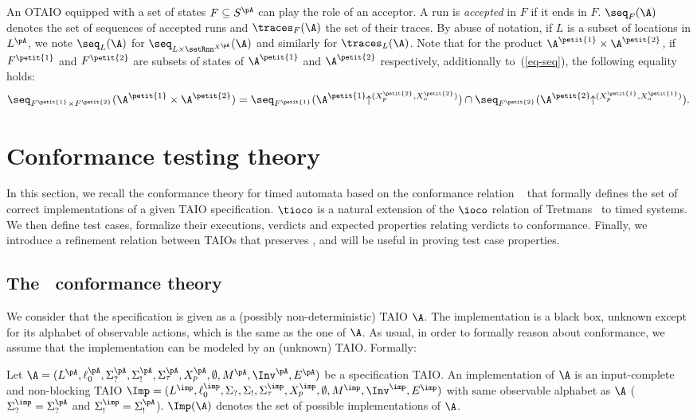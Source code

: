 \documentclass{LMCS}
\theoremstyle{plain}\newtheorem{proposition}[thm]{Proposition}
\begin{document}
An OTAIO  equipped 
with a set of states $F \subseteq S^\pA$ can play the role of an acceptor.
A run is  {\em accepted} in $F$ if it ends in $F$.
$\seq_{F}(\A)$ denotes the set of sequences of accepted runs
and $\traces_{F}(\A)$ the set of their traces.
By abuse of notation, if $L$ is a subset of locations in $L^\pA$,
we note $\seq_L(\A)$ for $\seq_{L\times\setRnn^{X^\pA}}(\A)$ and 
similarly for $\traces_L(\A)$. 
Note that for the product $\A^{\petit{1}} \times \A^{\petit{2}}$, if $F^{\petit{1}}$ and $F^{\petit{2}}$
are subsets of states of $\A^{\petit{1}}$ and $\A^{\petit{2}}$ respectively, additionally to~(\ref{eq-seq}), the following equality holds:
\begin{equation}
\label{eq-seq-acc} 
\seq_{F^{\petit{1}}\times F^{\petit{2}}}(\A^{\petit{1}} \times
  \A^{\petit{2}}) =
  \seq_{F^{\petit{1}}}(\A^{\petit{1}}\!\!\uparrow^{(X^{\petit{2}}_p,X^{\petit{2}}_o)})
  \cap
  \seq_{F^{\petit{2}}}(\A^{\petit{2}}\!\!\uparrow^{(X^{\petit{1}}_p,X^{\petit{1}}_o)}).
\end{equation}



\section{Conformance testing theory}
\label{sec-conformance}

In this section, we recall the conformance theory for timed automata
based on the conformance relation \tioco~\cite{KrichenTripakis09}
 that formally defines the set of correct
implementations of a given TAIO specification.  $\tioco$ is a natural
extension of the $\ioco$ relation of Tretmans~\cite{Tretmans-SCT96} to timed
systems.  We then define test cases, formalize their executions,
verdicts and expected properties relating verdicts to conformance. 
Finally, we introduce a refinement
relation between TAIOs that preserves \tioco, and will be useful in proving 
test case properties.

\subsection{The \tioco~conformance theory}
We consider that the specification is given as a  (possibly
non-deterministic) TAIO $\A$.
The implementation is a black box, unknown
except for its alphabet of observable actions, which is the same as
the one of $\A$.  
As usual, in order to formally
reason about conformance, we assume that the implementation can be
modeled by an (unknown) TAIO.
Formally:
\begin{defi}[Implementation]
Let $\A=(L^\pA,\ell_0^\pA,\Sigma_?^\pA,\Sigma_!^\pA,\Sigma_\tau^\pA,X_p^\pA,\emptyset,M^\pA,\Inv^\pA,E^\pA)$ be a specification TAIO.
An implementation of $\A$ is an input-complete and non-blocking TAIO
$\Imp=(L^\imp,\ell_0^\imp,\Sigma_?,\Sigma_!,\Sigma_\tau^\imp,X_p^\imp,\emptyset,M^\imp,\Inv^\imp,E^\imp)$
with same observable alphabet as $\A$ ($\Sigma_?^\imp=\Sigma_?^\pA$ and $\Sigma_!^\imp=\Sigma_!^\pA$).
$\Imp(\A)$ denotes the set of possible implementations of $\A$.
\end{defi}
\end{document}
